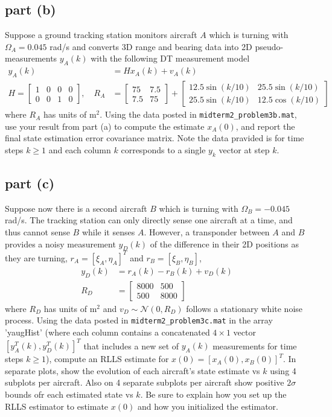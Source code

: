 \documentclass[11pt]{article}
\begin{document}
\subsection*{part (b)}
Suppose a ground tracking station monitors aircraft $A$ which is turning with $\Omega_A=0.045$ rad/s and converts 3D range and bearing data into 2D pseudo-measurements $y_A(k)$ with the following DT measurement model
\begin{align*}
	y_A(k) &= Hx_A(k)+v_A(k) \\
	H = \begin{bmatrix} 1&0&0&0\\0&0&1&0 \end{bmatrix},\quad R_A &= \begin{bmatrix} 75&7.5\\7.5&75 \end{bmatrix} + \begin{bmatrix} 12.5\sin(k/10) & 25.5\sin(k/10) \\ 25.5\sin(k/10) & 12.5\cos(k/10) \end{bmatrix}
\end{align*}
where $R_A$ has units of $\text{m}^2$. Using the data posted in \texttt{midterm2\_problem3b.mat}, use your result from part (a) to compute the estimate $x_A(0)$, and report the final state estimation error covariance matrix. Note the data pravided is for time steps $k\geq1$ and each column $k$ corresponds to a single $y_k$ vector at step $k$.

\subsection*{part (c)}
Suppose now there is a second aircraft $B$ which is turning with $\Omega_B=-0.045$ rad/s. The tracking station can only directly sense one aircraft at a time, and thus cannot sense $B$ while it senses $A$. However, a transponder between $A$ and $B$ provides a noisy measurement $y_D(k)$ of the difference in their 2D positions as they are turning, $r_A=[\xi_A,\eta_A]^T$ and $r_B=[\xi_B,\eta_B]$,
\begin{align*}
	y_D(k)&=r_A(k)-r_B(k)+v_D(k) \\
	R_D &= \begin{bmatrix} 8000 & 500 \\ 500 & 8000 \end{bmatrix}
\end{align*}
where $R_D$ has units of $\text{m}^2$ and $v_D\sim\mathcal{N}(0,R_D)$ follows a stationary white noise process. Using the data posted in \texttt{midterm2\_problem3c.mat} in the array 'yaugHist' (where each column contains a concatenated $4\times1$ vector $[y_A^T(k),y_D^T(k)]^T$ that includes a new set of $y_A(k)$ measurements for time steps $k\geq1$), compute an RLLS estimate for $x(0)=[x_A(0),x_B(0)]^T$. In separate plots, show the evolution of each aircraft's state estimate vs $k$ using 4 subplots per aircraft. Also on 4 separate subplots per aircraft show positive $2\sigma$ bounds ofr each estimated state vs $k$. Be sure to explain how you set up the RLLS estimator to estimate $x(0)$ and how you initialized the estimator.
\end{document}

